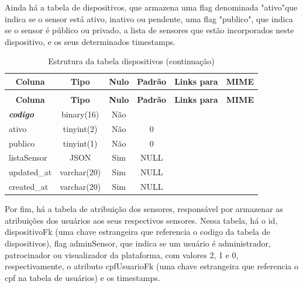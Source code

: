 \documentclass[tcc,capa]{texufpel}
\begin{document}
Ainda há a tabela de dispositivos, que armazena uma flag denominada "ativo"\space que indica se o sensor está ativo, inativo ou pendente, uma flag "publico", que indica se o sensor é público ou privado, a lista de sensores que estão incorporados neste dispositivo, e os seus determinados timestamps.
%
%
\begin{longtable}{|l|c|c|c|l|l|}
\caption{Estrutura da tabela dispositivos} \label{tab:dispositivos-structure} \\
\hline \multicolumn{1}{|c|}{\textbf{Coluna}} & \multicolumn{1}{|c|}{\textbf{Tipo}} & \multicolumn{1}{|c|}{\textbf{Nulo}} & \multicolumn{1}{|c|}{\textbf{Padrão}} & \multicolumn{1}{|c|}{\textbf{Links para}} & \multicolumn{1}{|c|}{\textbf{MIME}} \\ \hline \hline
\endfirsthead
\caption{Estrutura da tabela dispositivos (continuação)} \\ 
\hline \multicolumn{1}{|c|}{\textbf{Coluna}} & \multicolumn{1}{|c|}{\textbf{Tipo}} & \multicolumn{1}{|c|}{\textbf{Nulo}} & \multicolumn{1}{|c|}{\textbf{Padrão}} & \multicolumn{1}{|c|}{\textbf{Links para}} & \multicolumn{1}{|c|}{\textbf{MIME}} \\ \hline \hline \endhead \endfoot
\textbf{\textit{codigo}} & binary(16) & Não &  &  &  \\ \hline
ativo & tinyint(2) & Não & 0 &  &  \\ \hline
publico & tinyint(1) & Não & 0 &  &  \\ \hline
listaSensor & JSON & Sim & NULL &  &  \\ \hline
updated\_at & varchar(20) & Sim & NULL &  &  \\ \hline
created\_at & varchar(20) & Sim & NULL &  &  \\ \hline
\end{longtable}

 
Por fim, há a tabela de atribuição dos sensores, responsável por armazenar as atribuições dos usuários aos seus respectivos sensores. Nessa tabela, há o id, dispositivoFk (uma chave estrangeira que referencia o codigo da tabela de dispositivos), flag adminSensor, que indica se um usuário é administrador, patrocinador ou visualizador da plataforma, com valores 2, 1 e 0, respectivamente, o atributo cpfUsuarioFk (uma chave estrangeira que referencia o cpf na tabela de usuários) e os timestamps.
\end{document}
